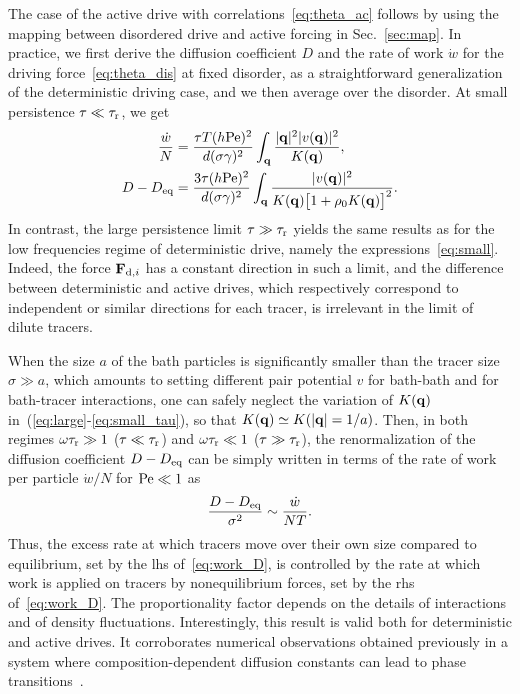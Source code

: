 \documentclass[superscriptaddress, twocolumn, prx, longbibliography, nofootinbib]{revtex4-1}
\begin{document}
The case of the active drive with correlations~\eqref{eq:theta_ac} follows by using the mapping between disordered drive and active forcing in Sec.~\ref{sec:map}. In practice, we first derive the diffusion coefficient $D$ and the rate of work $\dot w$ for the driving force~\eqref{eq:theta_dis} at fixed disorder, as a straightforward generalization of the deterministic driving case, and we then average over the disorder. At small persistence $\tau\ll\tau_{\rm r}$, we get
\begin{equation}\label{eq:small_tau}
	\begin{aligned}
		\frac{\dot w}{N} &=  \frac{\tau T(h{\rm Pe})^2}{d(\sigma\gamma)^2} \int_{\bf q} \frac{|{\bf q}|^2 |v({\bf q})|^2}{K({\bf q})} ,
		\\
		D-D_{\rm eq} &= \frac{3\tau(h{\rm Pe})^2}{d(\sigma\gamma)^2} \int_{\bf q}\frac{|v({\bf q})|^2 } {K({\bf q})\big[1 + \rho_0 K({\bf q})\big]^2} .
	\end{aligned}
\end{equation}
In contrast, the large persistence limit $\tau\gg\tau_{\rm r}$ yields the same results as for the low frequencies regime of deterministic drive, namely the expressions~\eqref{eq:small}. Indeed, the force ${\bf F}_{{\rm d},i}$ has a constant direction in such a limit, and the difference between deterministic and active drives, which respectively correspond to independent or similar directions for each tracer, is irrelevant in the limit of dilute tracers.


When the size $a$ of the bath particles is significantly smaller than the tracer size $\sigma\gg a$, which amounts to setting different pair potential $v$ for bath-bath and for bath-tracer interactions, one can safely neglect the variation of $K({\bf q})$ in~(\ref{eq:large}-\ref{eq:small_tau}), so that $K({\bf q}) \simeq K(|{\bf q}|=1/a)$. Then, in both regimes $\omega\tau_{\rm r}\gg 1$ ($\tau\ll\tau_{\rm r}$) and $\omega\tau_{\rm r}\ll 1$ ($\tau\gg\tau_{\rm r}$), the renormalization of the diffusion coefficient $D-D_{\rm eq}$ can be simply written in terms of the rate of work per particle $\dot w/N$ for ${\rm Pe}\ll1$ as
\begin{equation}\label{eq:work_D}
	\frac{D-D_{\rm eq}}{\sigma^2} \sim \frac{\dot w}{NT} .
\end{equation}
Thus, the excess rate at which tracers move over their own size compared to equilibrium, set by the lhs of~\eqref{eq:work_D}, is controlled by the rate at which work is applied on tracers by nonequilibrium forces, set by the rhs of~\eqref{eq:work_D}. The proportionality factor depends on the details of interactions and of density fluctuations. Interestingly, this result is valid both for deterministic and active drives. It corroborates numerical observations obtained previously in a system where composition-dependent diffusion constants can lead to phase transitions~\cite{delJunco2018}.
\end{document}
